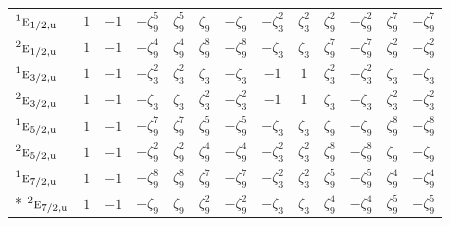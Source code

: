 \documentclass[10pt,a4paper]{article}
\numberwithin{equation}{section}
\newcommand{\irr}[1]{\text{\normalfont\scshape #1}}
\newcommand{\conjpair}[1]{{}^{#1}}
\newcommand{\ptag}[1]{\mathrm{#1}}
\newcommand{\rootunity}[1]{\zeta_{#1}}
\begin{document}
{\begin{longtable}{@{}lcccccccccccc@{}}
$\conjpair{1}\irr{e}_{1/2,\ptag{u}}$ & $1$ & $-1$ & $-\rootunity{9}^{5}$ & $\rootunity{9}^{5}$ & $\rootunity{9}$ & $-\rootunity{9}$ & $-\rootunity{3}^{2}$ & $\rootunity{3}^{2}$ & $\rootunity{9}^{2}$ & $-\rootunity{9}^{2}$ & $\rootunity{9}^{7}$ & $-\rootunity{9}^{7}$\\
$\conjpair{2}\irr{e}_{1/2,\ptag{u}}$ & $1$ & $-1$ & $-\rootunity{9}^{4}$ & $\rootunity{9}^{4}$ & $\rootunity{9}^{8}$ & $-\rootunity{9}^{8}$ & $-\rootunity{3}$ & $\rootunity{3}$ & $\rootunity{9}^{7}$ & $-\rootunity{9}^{7}$ & $\rootunity{9}^{2}$ & $-\rootunity{9}^{2}$\\
$\conjpair{1}\irr{e}_{3/2,\ptag{u}}$ & $1$ & $-1$ & $-\rootunity{3}^{2}$ & $\rootunity{3}^{2}$ & $\rootunity{3}$ & $-\rootunity{3}$ & $-1$ & $1$ & $\rootunity{3}^{2}$ & $-\rootunity{3}^{2}$ & $\rootunity{3}$ & $-\rootunity{3}$\\
$\conjpair{2}\irr{e}_{3/2,\ptag{u}}$ & $1$ & $-1$ & $-\rootunity{3}$ & $\rootunity{3}$ & $\rootunity{3}^{2}$ & $-\rootunity{3}^{2}$ & $-1$ & $1$ & $\rootunity{3}$ & $-\rootunity{3}$ & $\rootunity{3}^{2}$ & $-\rootunity{3}^{2}$\\
$\conjpair{1}\irr{e}_{5/2,\ptag{u}}$ & $1$ & $-1$ & $-\rootunity{9}^{7}$ & $\rootunity{9}^{7}$ & $\rootunity{9}^{5}$ & $-\rootunity{9}^{5}$ & $-\rootunity{3}$ & $\rootunity{3}$ & $\rootunity{9}$ & $-\rootunity{9}$ & $\rootunity{9}^{8}$ & $-\rootunity{9}^{8}$\\
$\conjpair{2}\irr{e}_{5/2,\ptag{u}}$ & $1$ & $-1$ & $-\rootunity{9}^{2}$ & $\rootunity{9}^{2}$ & $\rootunity{9}^{4}$ & $-\rootunity{9}^{4}$ & $-\rootunity{3}^{2}$ & $\rootunity{3}^{2}$ & $\rootunity{9}^{8}$ & $-\rootunity{9}^{8}$ & $\rootunity{9}$ & $-\rootunity{9}$\\
$\conjpair{1}\irr{e}_{7/2,\ptag{u}}$ & $1$ & $-1$ & $-\rootunity{9}^{8}$ & $\rootunity{9}^{8}$ & $\rootunity{9}^{7}$ & $-\rootunity{9}^{7}$ & $-\rootunity{3}^{2}$ & $\rootunity{3}^{2}$ & $\rootunity{9}^{5}$ & $-\rootunity{9}^{5}$ & $\rootunity{9}^{4}$ & $-\rootunity{9}^{4}$\\*
$\conjpair{2}\irr{e}_{7/2,\ptag{u}}$ & $1$ & $-1$ & $-\rootunity{9}$ & $\rootunity{9}$ & $\rootunity{9}^{2}$ & $-\rootunity{9}^{2}$ & $-\rootunity{3}$ & $\rootunity{3}$ & $\rootunity{9}^{4}$ & $-\rootunity{9}^{4}$ & $\rootunity{9}^{5}$ & $-\rootunity{9}^{5}$\\
\bottomrule\end{longtable}}
\end{document}
